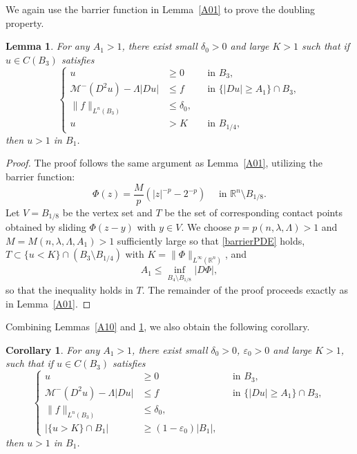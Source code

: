 \documentclass[11pt]{amsart}
\theoremstyle{plain}
\newtheorem{lemma}[theorem]{Lemma}
\newtheorem{corollary}[theorem]{Corollary}
\theoremstyle{definition}
\numberwithin{equation}{section}
\begin{document}
We again use the barrier function in Lemma~\ref{A01} to prove the doubling property.
\begin{lemma} \label{A11}
    For any $A_1>1$, there exist small $\delta_0>0$ and large $K>1$ such that if $u \in C(B_3)$  satisfies
    \begin{equation*}
    \left\{
    \begin{aligned}
        u &\geq 0 &&\text{in } B_3,\\
        \mathcal{M}^-(D^2u)-\Lambda|Du| &\leq f &&\text{in } \{|Du| \geq A_1\}\cap B_3, \\
        \|f\|_{L^n(B_3)} &\leq \delta_0, \\
        u&>K &&\text{in } B_{1/4},
    \end{aligned}
    \right.
    \end{equation*}
    then $u>1$ in $B_1$.
\end{lemma}

\begin{proof}
The proof follows the same argument as Lemma~\ref{A01}, utilizing the barrier function:
\begin{equation*}
    \Phi(z) =  \frac{M}{p}(|z|^{-p}-2^{-p}) \quad \text { in } \mathbb{R}^n\setminus B_{1/8}.
\end{equation*}
Let  $V = B_{1/8}$ be the vertex set and $T$ be the set of corresponding contact points obtained by sliding $\Phi(z-y)$ with $y \in V$.
We choose $p=p(n, \lambda, \Lambda)>1$ and $M=M(n,\lambda,\Lambda, A_1)>1$ sufficiently large so that \eqref{barrierPDE} holds, $T \subset \{ u<K\} \cap (B_3 \setminus B_{1/4})$ with $K=\|\Phi\|_{L^\infty(\mathbb{R}^n)}$, and
\begin{equation*}
    A_1 \leq  \inf_{B_4\setminus B_{1/8}}|D\Phi|,
\end{equation*}
so that the inequality holds in $T$. The remainder of the proof proceeds exactly as in Lemma~\ref{A01}.
\end{proof}

Combining Lemmas~\ref{A10} and \ref{A11}, we also obtain the following corollary.

\begin{corollary} \label{A1}
    For any $A_1>1$, there exist small $\delta_0>0$, $\varepsilon_0>0$ and large $K>1$, such that if  $u \in C(B_3)$ satisfies
    \begin{equation*}
    \left\{
    \begin{aligned}
        u &\geq 0 &&\text{in } B_3,\\
        \mathcal{M}^-(D^2u)-\Lambda|Du| &\leq f &&\text{in } \{|Du| \geq A_1\}\cap B_3, \\
        \|f\|_{L^n(B_3)} &\leq \delta_0, \\
        |\{u>K\} \cap B_1| &\geq (1-\varepsilon_0)|B_1|,
    \end{aligned}
    \right.
    \end{equation*}
    then $u>1$ in $B_1$.
\end{corollary}
\end{document}
